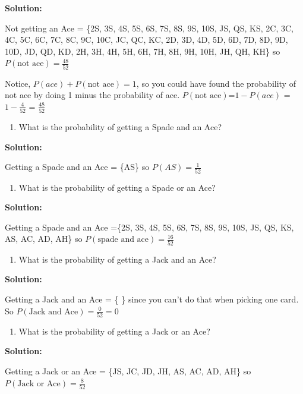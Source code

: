 \documentclass[
]{book}
\providecommand{\tightlist}{%
  \setlength{\itemsep}{0pt}\setlength{\parskip}{0pt}}
\begin{document}
\textbf{Solution:}

Not getting an Ace = \{2S, 3S, 4S, 5S, 6S, 7S, 8S, 9S, 10S, JS, QS, KS, 2C, 3C, 4C, 5C, 6C, 7C, 8C, 9C, 10C, JC, QC, KC, 2D, 3D, 4D, 5D, 6D, 7D, 8D, 9D, 10D, JD, QD, KD, 2H, 3H, 4H, 5H, 6H, 7H, 8H, 9H, 10H, JH, QH, KH\} so \(P(\text{not ace})=\frac{48}{52}\)

Notice, \(P(ace)+P(\text{not ace})=1\), so you could have found the probability of not ace by doing 1 minus the probability of ace. \(P(\text{not ace})\)=\(1-P(ace)\) = \(1-\frac{4}{52}\) = \(\frac{48}{52}\)

\begin{enumerate}
\def\labelenumi{\alph{enumi}.}
\setcounter{enumi}{5}
\tightlist
\item
  What is the probability of getting a Spade and an Ace?
\end{enumerate}

\textbf{Solution:}

Getting a Spade and an Ace = \{AS\} so \(P(AS)=\frac{1}{52}\)

\begin{enumerate}
\def\labelenumi{\alph{enumi}.}
\setcounter{enumi}{6}
\tightlist
\item
  What is the probability of getting a Spade or an Ace?
\end{enumerate}

\textbf{Solution:}

Getting a Spade and an Ace =\{2S, 3S, 4S, 5S, 6S, 7S, 8S, 9S, 10S, JS, QS, KS, AS, AC, AD, AH\} so \(P(\text{spade and ace})=\frac{16}{52}\)

\begin{enumerate}
\def\labelenumi{\alph{enumi}.}
\setcounter{enumi}{7}
\tightlist
\item
  What is the probability of getting a Jack and an Ace?
\end{enumerate}

\textbf{Solution:}

Getting a Jack and an Ace = \{ \} since you can't do that when picking one card. So \(P(\text{Jack and Ace})=\frac{0}{52}=0\)

\begin{enumerate}
\def\labelenumi{\roman{enumi}.}
\tightlist
\item
  What is the probability of getting a Jack or an Ace?
\end{enumerate}

\textbf{Solution:}

Getting a Jack or an Ace = \{JS, JC, JD, JH, AS, AC, AD, AH\} so \(P(\text{Jack or Ace})=\frac{8}{52}\)
\end{document}
